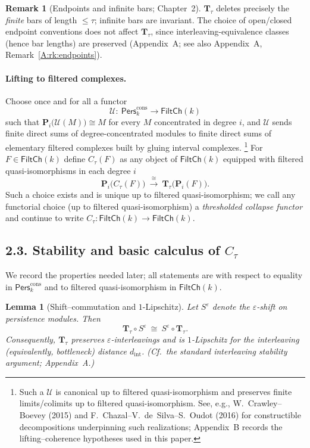 \documentclass[11pt]{article}
\newcommand{\Pers}{\mathsf{Pers}}
\numberwithin{equation}{section}
\newtheorem{lemma}[theorem]{Lemma}
\theoremstyle{definition}
\newtheorem{remark}[theorem]{Remark}
\begin{document}
\begin{remark}[Endpoints and infinite bars; Chapter~2]\label{rk:2-endpoints}
\(\mathbf{T}_\tau\) deletes precisely the \emph{finite} bars of length \(\le\tau\); infinite bars are invariant. The choice of open/closed endpoint conventions does not affect \(\mathbf{T}_\tau\), since interleaving-equivalence classes (hence bar lengths) are preserved (Appendix~A; see also Appendix~A, Remark~\ref{A:rk:endpoints}).
\end{remark}

\paragraph{Lifting to filtered complexes.}
Choose once and for all a functor
\[
\mathcal{U}:\ \Pers^{\mathrm{cons}}_k\longrightarrow \mathsf{FiltCh}(k)
\]
such that \(\mathbf{P}_i\big(\mathcal{U}(M)\big)\cong M\) for every \(M\) concentrated in degree \(i\), and \(\mathcal{U}\) sends finite direct sums of degree-concentrated modules to finite direct sums of elementary filtered complexes built by gluing interval complexes.%
\footnote{Such a \(\mathcal{U}\) is canonical up to filtered quasi-isomorphism and preserves finite limits/colimits up to filtered quasi-isomorphism. See, e.g., W.~Crawley--Boevey (2015) and F.~Chazal–V.~de~Silva–S.~Oudot (2016) for constructible decompositions underpinning such realizations; Appendix~B records the lifting–coherence hypotheses used in this paper.}
For \(F\in \mathsf{FiltCh}(k)\) define \(C_\tau(F)\) as any object of \(\mathsf{FiltCh}(k)\) equipped with filtered quasi-isomorphisms in each degree \(i\)
\[
\mathbf{P}_i\big(C_\tau(F)\big)\ \xrightarrow{\ \cong\ }\ \mathbf{T}_\tau\!\big(\mathbf{P}_i(F)\big).
\]
Such a choice exists and is unique up to filtered quasi-isomorphism; we call any functorial choice (up to filtered quasi-isomorphism) a \emph{thresholded collapse functor} and continue to write \(C_\tau:\mathsf{FiltCh}(k)\to\mathsf{FiltCh}(k)\).

\subsection*{2.3. Stability and basic calculus of \texorpdfstring{$C_\tau$}{C\_\texttau}}
We record the properties needed later; all statements are with respect to equality in \(\Pers^{\mathrm{cons}}_k\) and to filtered quasi-isomorphism in \(\mathsf{FiltCh}(k)\).

\begin{lemma}[Shift–commutation and \(1\)-Lipschitz]\label{lem:shift}
Let \(S^\varepsilon\) denote the \(\varepsilon\)-shift on persistence modules. Then
\[
\mathbf{T}_\tau\circ S^\varepsilon\ \cong\ S^\varepsilon\circ \mathbf{T}_\tau.
\]
Consequently, \(\mathbf{T}_\tau\) preserves \(\varepsilon\)-interleavings and is \(1\)-Lipschitz for the interleaving (equivalently, bottleneck) distance \(d_{\mathrm{int}}\). (Cf.\ the standard interleaving stability argument; Appendix~A.)
\end{lemma}
\end{document}
